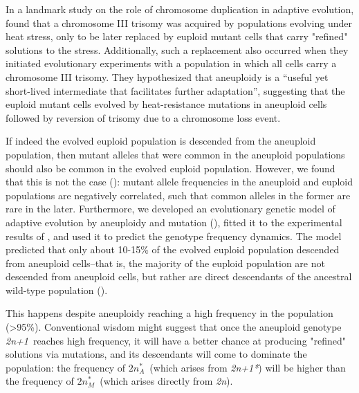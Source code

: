 \documentclass[12pt]{extarticle}
\newcommand{\euwt}{\emph{2n}}
\newcommand{\anwt}{\emph{2n+1}}
\newcommand{\eumtM}{\emph{$2n^*_M$}}
\newcommand{\eumtA}{\emph{$2n^*_A$}}
\newcommand{\anmt}{\emph{2n+1*}}
\begin{document}
In a landmark study on the role of chromosome duplication in adaptive evolution, 
\citet{Yona2012} found that a chromosome III trisomy was acquired by \yeast populations evolving under heat stress, only to be later replaced by euploid mutant cells that carry "refined" solutions to the stress. 
Additionally, such a replacement also occurred when they initiated evolutionary experiments with a population in which all cells carry a chromosome III trisomy.
They hypothesized that aneuploidy is a ``useful yet short-lived intermediate that facilitates further adaptation'', suggesting that the euploid mutant cells evolved by heat-resistance mutations in aneuploid cells followed by reversion of trisomy due to a chromosome loss event. 

If indeed the evolved euploid population is descended from the aneuploid population, then mutant alleles that were common in the aneuploid populations should also be common in the evolved euploid population.
However, we found that this is not the case (): mutant allele frequencies in the aneuploid and euploid populations are negatively correlated, such that common alleles in the former are rare in the later. 
Furthermore, we developed an evolutionary genetic model of adaptive evolution by aneuploidy and mutation (), fitted it to the experimental results of \citet{Yona2012}, and used it to predict the genotype frequency dynamics.
The model predicted that only about 10-15\% of the evolved euploid population descended from aneuploid cells--that is, the majority of the euploid population are not descended from aneuploid cells, but rather are direct descendants of the ancestral wild-type population ().

This happens despite aneuploidy reaching a high frequency in the population (>95\%). 
Conventional wisdom might suggest that once the aneuploid genotype \anwt\ reaches high frequency, it will have a better chance at producing "refined" solutions via mutations, and its descendants will come to dominate the population: the frequency of \eumtA\ (which arises from \anmt) will be higher than the frequency of \eumtM\ (which arises directly from \euwt).
\end{document}
